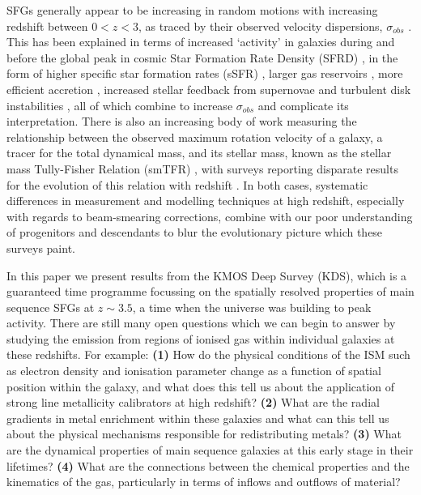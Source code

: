 \documentclass[fleqn,usenatbib]{mn2e}
\begin{document}
SFGs generally appear to be increasing in random motions with increasing redshift between $0 < z < 3$, as traced by their observed velocity dispersions, $\sigma_{obs}$ \citep{Genzel2008,ForsterSchreiber2009,Law2009,Cresci2009,Gnerucci2011,Epinat2012,Kassin2012,Green2014,Wisnioski2015,Stott2016}.
This has been explained in terms of increased `activity' in galaxies during and before the global peak in cosmic Star Formation Rate Density (SFRD) \citep{Madau_2014}, in the form of higher specific star formation rates (sSFR) \citep{Wisnioski2015}, larger gas reservoirs \citep{Law2009,ForsterSchreiber2009,Wisnioski2015,Stott2016}, more efficient accretion \citep{Law2009}, increased stellar feedback from supernovae \citep{Kassin2012} and turbulent disk instabilities \citep{Law2009,Bournaud2007,Bournaud2016}, all of which combine to increase $\sigma_{obs}$ and complicate its interpretation.
There is also an increasing body of work measuring the relationship between the observed maximum rotation velocity of a galaxy, a tracer for the total dynamical mass, and its stellar mass, known as the stellar mass Tully-Fisher Relation (smTFR) \citep{Tully1977}, with surveys reporting disparate results for the evolution of this relation with redshift \citep[e.g.][]{Puech2008,Miller2011,Gnerucci2011,Tiley2016a,Harrison2017}.
In both cases, systematic differences in measurement and modelling techniques at high redshift, especially with regards to beam-smearing corrections, combine with our poor understanding of progenitors and descendants to blur the evolutionary picture which these surveys paint.

In this paper we present results from the KMOS Deep Survey (KDS), which is a guaranteed time programme focussing on the spatially resolved properties of main sequence SFGs at $z\sim3.5$, a time when the universe was building to peak activity.
There are still many open questions which we can begin to answer by studying the emission from regions of ionised gas within individual galaxies at these redshifts.
For example: \textbf{(1)} How do the physical conditions of the ISM such as electron density and ionisation parameter change as a function of spatial position within the galaxy, and what does this tell us about the application of strong line metallicity calibrators at high redshift?
\textbf{(2)} What are the radial gradients in metal enrichment within these galaxies and what can this tell us about the physical mechanisms responsible for redistributing metals?
\textbf{(3)} What are the dynamical properties of main sequence galaxies at this early stage in their lifetimes? 
\textbf{(4)} What are the connections between the chemical properties and the kinematics of the gas, particularly in terms of inflows and outflows of material?
\end{document}

